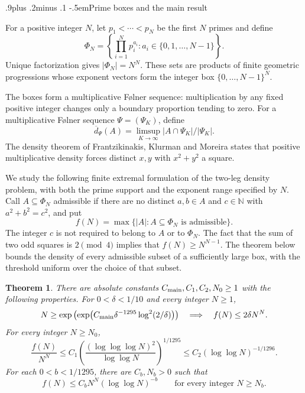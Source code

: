 \documentclass[twoside]{aomart}
\makeatletter
\theoremstyle{paperplain}
\newtheorem{theorem}{Theorem}[section]
\theoremstyle{paperdefinition}
\renewcommand\subsection{\@startsection{subsection}{2}{\z@}
  {.9\baselineskip plus .2\baselineskip minus .1\baselineskip}
  {-.5em}{\normalfont\bfseries}}
\newcommand{\N}{\mathbb N}
\numberwithin{equation}{section}
\makeatother
\begin{document}
\subsection{Prime boxes and the main result}

For a positive integer $N$, let $p_1<\cdots<p_N$ be the first $N$
primes and define
\begin{equation*}
 \Phi_N=\left\{\prod_{i=1}^N p_i^{a_i}:
              a_i\in\{0,1,\ldots,N-1\}\right\}.
\end{equation*}
Unique factorization gives $|\Phi_N|=N^N$. These sets are products of finite geometric progressions whose exponent
vectors form the integer box $\{0,\ldots,N-1\}^N$.

The boxes form a multiplicative F\o lner sequence: multiplication by
any fixed positive integer changes only a boundary proportion tending to
zero.  For a multiplicative F\o lner sequence $\Psi=(\Psi_K)$, define
$$\overline d_\Psi(A)=\limsup_{K\to\infty}|A\cap\Psi_K|/|\Psi_K|.$$
The density theorem of Frantzikinakis, Klurman and Moreira \cite[Theorem~1.2(1), with $a=b=c=1$]{FKM} states that
positive multiplicative density forces distinct $x,y$ with
$x^2+y^2$ a square.

We study the following finite extremal formulation of the two-leg
density problem, with both the prime support and the exponent range
specified by $N$. Call
$A\subseteq\Phi_N$ admissible if there are no distinct $a,b\in A$
and $c\in\N$ with $a^2+b^2=c^2$, and put
\begin{equation*}
 f(N)=\max\{|A|:A\subseteq\Phi_N\text{ is admissible}\}.
\end{equation*}
The integer $c$ is not required to belong to $A$ or to $\Phi_N$. The fact that the sum of two odd squares is $2\pmod 4$ implies that $f(N)\ge N^{N-1}$.
The theorem below bounds the density of every
admissible subset of a sufficiently large box, with the threshold
uniform over the choice of that subset.

\begin{theorem}
\label{thm:main}
There are absolute constants $C_{\rm main},C_1,C_2,N_0\ge1$
with the following properties. For $0<\delta<1/10$ and every integer $N\ge1$,
\begin{equation}
 N\ge\exp\left(\exp\!\left(C_{\rm main}\delta^{-1295}\log^2(2/\delta)\right)\right)
 \quad\Longrightarrow\quad f(N)\le2\delta N^N.
 \label{eq:main-threshold}
\end{equation}
For every integer $N\ge N_0$,
\begin{equation}
 \frac{f(N)}{N^N}
 \le C_1\left(\frac{(\log\log\log N)^2}{\log\log N}\right)^{1/1295}
 \le C_2(\log\log N)^{-1/1296}.
 \label{eq:main-rate}
\end{equation}
For each $0<b<1/1295$, there are $C_b,N_b>0$ such that
\begin{equation}
 f(N)\le C_b N^N(\log\log N)^{-b}
 \qquad\text{for every integer }N\ge N_b.
 \label{eq:main-other-powers}
\end{equation}
\end{theorem}
\end{document}
